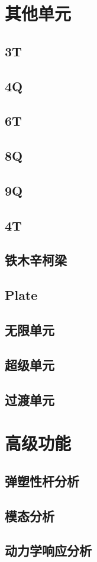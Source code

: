 \documentclass[UTF8]{ctexbook}
\begin{document}
\section{其他单元}
\subsection{3T}

\subsection{4Q}

\subsection{6T}

\subsection{8Q}

\subsection{9Q}

\subsection{4T}

\subsection{铁木辛柯梁}

\subsection{Plate}

\subsection{无限单元}

\subsection{超级单元}

\subsection{过渡单元}

\section{高级功能}
\subsection{弹塑性杆分析}

\subsection{模态分析}

\subsection{动力学响应分析}
\end{document}
